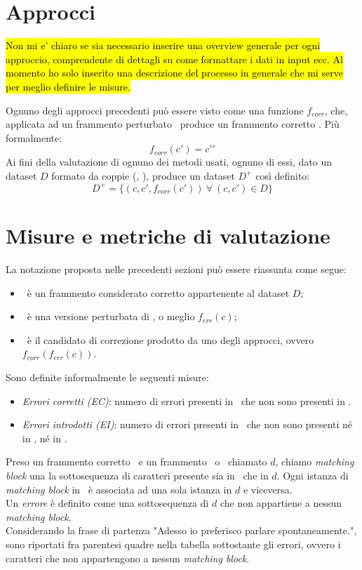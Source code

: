 \documentclass[12pt]{article}
\begin{document}
\section{Approcci} \label{sec:approcci}
\hl{Non mi e' chiaro se sia necessario inserire una overview generale per ogni approccio, comprendente di dettagli su come formattare i dati in input ecc. Al momento ho solo inserito una descrizione del processo in generale che mi serve per meglio definire le misure.}

Ognuno degli approcci precedenti può essere visto come una funzione $f_{corr}$, che, applicata ad un frammento perturbato \cp\, produce un frammento corretto \cs. Più formalmente:
\begin{equation}
	f_{corr}(c\prime) = c\prime\prime
\end{equation}
Ai fini della valutazione di ognuno dei metodi usati, ognuno di essi, dato un dataset $D$ formato da coppie (\cz, \cp), produce un dataset $D^+$ così definito:
\begin{equation}
	D^+ = \{		(c,c\prime,f_{corr}(c\prime))\ \forall\ (c,c\prime)	 \in D	\}
\end{equation}

\section{Misure e metriche di valutazione} \label{sec:metriche}

La notazione proposta nelle precedenti sezioni può essere riassunta come segue:
\begin{itemize}
\item \cz\ è un frammento considerato corretto appartenente al dataset $D$;
\item \cp\ è una versione perturbata di \cz, o meglio $f_{err}(c)$;
\item \cs\ è il candidato di correzione prodotto da uno degli approcci, ovvero $f_{corr}(f_{err}(c))$.
\end{itemize}
Sono definite informalmente le seguenti misure:
\begin{itemize}
\item \textit{Errori corretti (EC)}: numero di errori presenti in \cp\ che non sono presenti in \cs.
\item \textit{Errori introdotti (EI)}: numero di errori presenti in \cs\ che non sono presenti né in \cp, né in \cz. 
\end{itemize}Preso un frammento corretto \cp\ e un frammento \cp\ o \cs\ chiamato $d$, chiamo \textit{matching block} una la sottosequenza di caratteri presente sia in \cp\ che in $d$. Ogni istanza di \textit{matching block} in \cp\ è associata ad una sola istanza in $d$ e viceversa.\\
Un \textit{errore} è definito come una sottosequenza di $d$ che non appartiene a nessun \textit{matching block}.\\
Considerando la frase di partenza "Adesso io preferisco parlare spontaneamente.", sono riportati fra parentesi quadre nella tabella sottostante gli errori, ovvero i caratteri che non appartengono a nessun \textit{matching block}.
\end{document}

